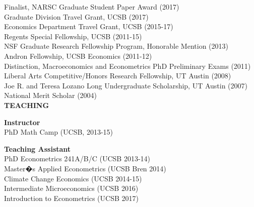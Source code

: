 \documentclass[english, 10pt]{report}
\begin{document}
Finalist, NARSC Graduate Student Paper Award (2017) \\
Graduate Division Travel Grant, UCSB (2017) \\
Economics Department Travel Grant, UCSB (2015-17) \\
Regents Special Fellowship, UCSB (2011-15) \\
NSF Graduate Research Fellowship Program, Honorable Mention (2013) \\
Andron Fellowship, UCSB Economics (2011-12)  \\
Distinction, Macroeconomics and Econometrics PhD Preliminary Exams (2011) \\
Liberal Arts Competitive/Honors Research Fellowship, UT Austin (2008) \\
Joe R. and Teresa Lozano Long Undergraduate Scholarship, UT Austin (2007) \\
National Merit Scholar (2004) \\

{\bf {TEACHING}}

{\bf Instructor} \\[4pt]
PhD Math Camp (UCSB, 2013-15) 

{\bf Teaching Assistant} \\[4pt]
PhD Econometrics 241A/B/C (UCSB 2013-14)\\
Master�s Applied Econometrics (UCSB Bren 2014) \\
Climate Change Economics (UCSB 2014-15) \\
Intermediate Microeconomics (UCSB 2016) \\
Introduction to Econometrics (UCSB 2017)
\end{document}

